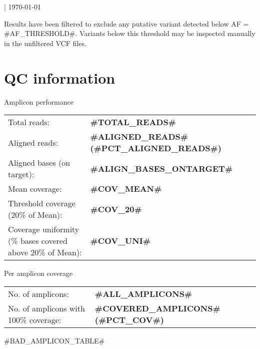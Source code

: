 \documentclass[11pt]{article}
\newcommand{\lightfont}{\fontseries{l}\selectfont}
\newcommand{\mediumfont}{\fontseries{m}\selectfont}
\begin{document}
\noindent
{\fontsize{16pt}{16pt}\selectfont {}}

\medskip
\noindent
{\lightfont {#PANEL#} | \today}

\medskip
\noindent Results have been filtered to exclude any putative variant detected below AF = {{#AF_THRESHOLD#}}. Variants below this threshold may be inspected manually in the unfiltered VCF files.

\section{QC information}

\begin{multicols}{2}
\noindent
{\color{darkblue1} \fontsize{14pt}{14pt}\selectfont Amplicon performance}\\

\noindent
\lightfont
{}
\begin{tabularx}{\columnwidth}{X l}

Total reads: & \textbf{{#TOTAL_READS#}} \\
Aligned reads: & \textbf{{#ALIGNED_READS#}} \textbf{({#PCT_ALIGNED_READS#})} \\
Aligned bases (on target):& \textbf{{#ALIGN_BASES_ONTARGET#}} \\
Mean coverage:& \textbf{{#COV_MEAN#}} \\
Threshold coverage (20\% of Mean): & \textbf{{#COV_20#}} \\
Coverage uniformity (\% bases covered above 20\% of Mean): & \textbf{{#COV_UNI#}}  \\
\end{tabularx}

\columnbreak

\noindent
\mediumfont
{\color{darkblue1} \fontsize{14pt}{14pt}\selectfont  Per amplicon coverage}\\

\noindent
\lightfont
{}
\begin{tabularx}{\columnwidth}{X l}

No. of amplicons:& \textbf{{{#ALL_AMPLICONS#}}} \\
No. of amplicons with 100\% coverage:& \textbf{{#COVERED_AMPLICONS#} ({#PCT_COV#})} \\
\end{tabularx}
\end{multicols}


{#BAD_AMPLICON_TABLE#}
\end{document}
